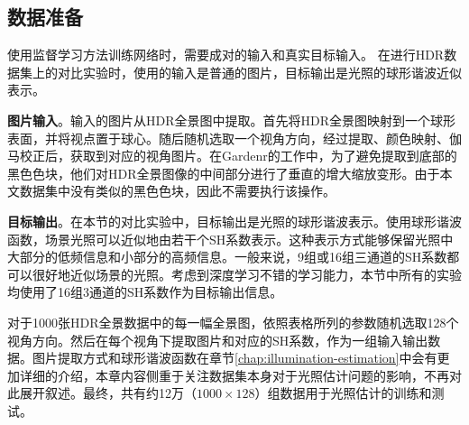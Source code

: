 \subsection{数据准备}
使用监督学习方法训练网络时，需要成对的输入和真实目标输入。
在进行HDR数据集上的对比实验时，使用的输入是普通的图片，目标输出是光照的球形谐波近似表示。

\textbf{图片输入}。输入的图片从HDR全景图中提取。首先将HDR全景图映射到一个球形表面，并将视点置于球心。随后随机选取一个视角方向，经过提取、颜色映射、伽马校正后，获取到对应的视角图片。在Gardenr\cite{gardner2017learning}的工作中，为了避免提取到底部的黑色色块，他们对HDR全景图像的中间部分进行了垂直的增大缩放变形。由于本文数据集中没有类似的黑色色块，因此不需要执行该操作。

\textbf{目标输出}。在本节的对比实验中，目标输出是光照的球形谐波表示。使用球形谐波函数，场景光照可以近似地由若干个SH系数表示。这种表示方式能够保留光照中大部分的低频信息和小部分的高频信息。一般来说，9组或16组三通道的SH系数都可以很好地近似场景的光照。考虑到深度学习不错的学习能力，本节中所有的实验均使用了16组3通道的SH系数作为目标输出信息。

对于1000张HDR全景数据中的每一幅全景图，依照表格所列的参数随机选取128个视角方向。然后在每个视角下提取图片和对应的SH系数，作为一组输入输出数据。图片提取方式和球形谐波函数在章节\ref{chap:illumination-estimation}中会有更加详细的介绍，本章内容侧重于关注数据集本身对于光照估计问题的影响，不再对此展开叙述。最终，共有约12万（$1000\times128$）组数据用于光照估计的训练和测试。

